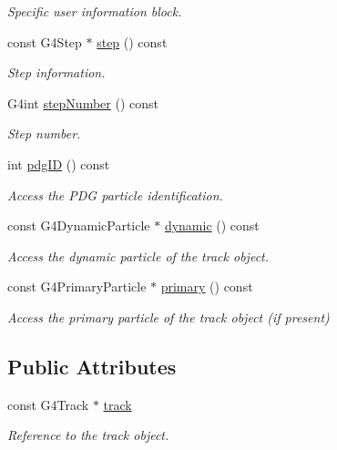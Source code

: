 \begin{DoxyCompactItemize}
\begin{DoxyCompactList}\small\item\em Specific user information block. \end{DoxyCompactList}\item 
const G4\+Step $\ast$ \hyperlink{class_d_d4hep_1_1_simulation_1_1_geant4_track_handler_a5d49e7ad72048dbfcdfd209c88d6d252}{step} () const
\begin{DoxyCompactList}\small\item\em Step information. \end{DoxyCompactList}\item 
G4int \hyperlink{class_d_d4hep_1_1_simulation_1_1_geant4_track_handler_af3908966bb8fcc2549d7fa206d587758}{step\+Number} () const
\begin{DoxyCompactList}\small\item\em Step number. \end{DoxyCompactList}\item 
int \hyperlink{class_d_d4hep_1_1_simulation_1_1_geant4_track_handler_a7211bc51d66addbea6e1f1185b59d270}{pdg\+ID} () const
\begin{DoxyCompactList}\small\item\em Access the P\+DG particle identification. \end{DoxyCompactList}\item 
const G4\+Dynamic\+Particle $\ast$ \hyperlink{class_d_d4hep_1_1_simulation_1_1_geant4_track_handler_a5821e52ab86d15c7f80cd758727df2c5}{dynamic} () const
\begin{DoxyCompactList}\small\item\em Access the dynamic particle of the track object. \end{DoxyCompactList}\item 
const G4\+Primary\+Particle $\ast$ \hyperlink{class_d_d4hep_1_1_simulation_1_1_geant4_track_handler_afb8ea564a87f821b18d3a5ae9e09bf70}{primary} () const
\begin{DoxyCompactList}\small\item\em Access the primary particle of the track object (if present) \end{DoxyCompactList}\end{DoxyCompactItemize}
\subsection*{Public Attributes}
\begin{DoxyCompactItemize}
\item 
const G4\+Track $\ast$ \hyperlink{class_d_d4hep_1_1_simulation_1_1_geant4_track_handler_a40a5ac7eb61ca69314a64f9f3c5a0f0b}{track}
\begin{DoxyCompactList}\small\item\em Reference to the track object. \end{DoxyCompactList}\end{DoxyCompactItemize}



